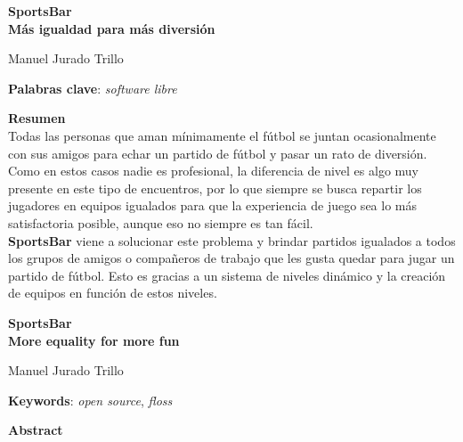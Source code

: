 \thispagestyle{empty}

\begin{center}
{\large\bfseries SportsBar \\ Más igualdad para más diversión }\\
\end{center}
\begin{center}
Manuel Jurado Trillo\\
\end{center}


\vspace{0.5cm}
\noindent\textbf{Palabras clave}: \textit{software libre}
\vspace{0.7cm}

\noindent\textbf{Resumen}\\

Todas las personas que aman mínimamente el fútbol se juntan ocasionalmente con sus amigos para echar un partido de fútbol y pasar un rato de diversión.
Como en estos casos nadie es profesional, la diferencia de nivel es algo muy presente en este tipo de encuentros, por lo que siempre se busca repartir los jugadores en equipos igualados
para que la experiencia de juego sea lo más satisfactoria posible, aunque eso no siempre es tan fácil.\\

\textbf{SportsBar} viene a solucionar este problema y brindar partidos igualados a todos los grupos de amigos o compañeros de trabajo que les gusta quedar para jugar un partido de fútbol.
Esto es gracias a un sistema de niveles dinámico y la creación de equipos en función de estos niveles.

	

\cleardoublepage

\begin{center}
	{\large\bfseries SportsBar \\ More equality for more fun}\\
\end{center}
\begin{center}
	Manuel Jurado Trillo\\
\end{center}
\vspace{0.5cm}
\noindent\textbf{Keywords}: \textit{open source}, \textit{floss}
\vspace{0.7cm}

\noindent\textbf{Abstract}\\

